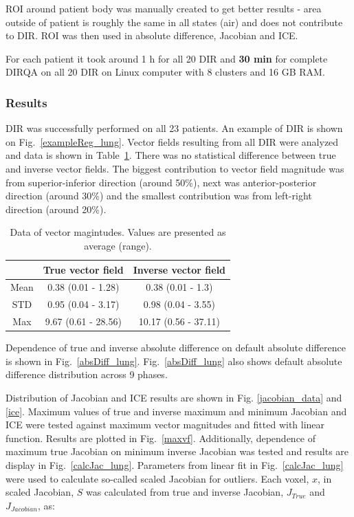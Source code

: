 \documentclass[type=dr, dr=rernat, accentcolor=tud7b,colorbacktitle, bigchapter, openright, twoside, 12pt ]{tudthesis}
\begin{document}
ROI around patient body was manually created to get better results - area outside of patient is roughly the same in all states (air) and does not contribute to DIR. ROI was then used in absolute difference, Jacobian and ICE.

For each patient it took around 1 h for all 20 DIR and \textbf{30 min} for complete DIRQA on all 20 DIR  on Linux computer with 8 clusters and 16 GB RAM.


\subsubsection{Results}

DIR was successfully performed on all 23 patients. An example of DIR is shown on Fig.~\ref{exampleReg_lung}. Vector fields resulting from all DIR were analyzed and data is shown in Table~\ref{tab:vectordata_lung}. There was no statistical
difference between true and inverse vector fields. The biggest contribution to vector field magnitude was from superior-inferior direction (around 50\%), next was anterior-posterior direction (around 30\%) and the smallest contribution was from left-right direction (around 20\%).

\begin{table}[H]
  \centering
  \caption{Data of vector magintudes. Values are presented as average (range).}
  \begin{tabular}{c|c|c}
  
       & True vector field & Inverse vector field  \\
       \hline
       Mean & 0.38 (0.01 - 1.28) & 0.38 (0.01 - 1.3) \\ 
       STD & 0.95 (0.04 - 3.17) & 0.98 (0.04 - 3.55) \\ 
       Max & 9.67 (0.61 - 28.56) & 10.17 (0.56 - 37.11) \\
    \hline\hline
  \end{tabular}
  \label{tab:vectordata_lung}
\end{table}

Dependence of true and inverse absolute difference on default absolute difference is shown in Fig.~\ref{absDiff_lung}. Fig.~\ref{absDiff_lung} also shows default absolute difference distribution across 9 phases. 

Distribution of Jacobian and ICE results are shown in Fig. \ref{jacobian_data} and \ref{ice}. Maximum values of true and inverse maximum and minimum Jacobian and ICE were tested against maximum vector magnitudes and fitted with linear function. Results are plotted in Fig.~\ref{maxvf}.
Additionally, dependence of maximum true Jacobian on minimum inverse Jacobian was tested and results are display in Fig.~\ref{calcJac_lung}. Parameters from linear fit in Fig.~\ref{calcJac_lung} were used to calculate so-called scaled Jacobian for outliers. Each voxel, $x$, in scaled Jacobian, $S$ was calculated from true and inverse Jacobian, $J_{True}$ and $J_{Jacobian}$, as:
\end{document}
